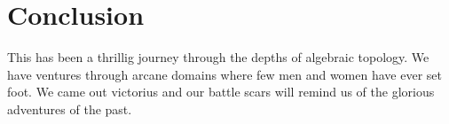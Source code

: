 \chapter{Conclusion}
\label{chapter5}

This has been a thrillig journey through the depths of algebraic topology. We have ventures through arcane domains where few men and women have ever set foot. We came out victorius and our battle scars will remind us of the glorious adventures of the past.

